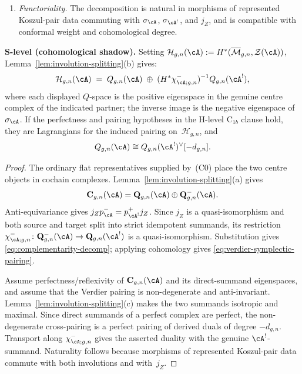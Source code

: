 \begin{theorem}
\begin{enumerate}[label=\textup{(\roman*)}]
\item \emph{Functoriality.}
 The decomposition is natural in morphisms of represented Koszul-pair
 data commuting with \(\sigma_{\cA}\), \(\sigma_{\cA^!}\), and
 \(j_Z\), and is compatible with conformal weight and cohomological
 degree.
\end{enumerate}

\smallskip\noindent
\textbf{S-level \textup{(}cohomological shadow\textup{)}.}
Setting $\mathcal{H}_{g,n}(\cA) := H^*(\overline{\mathcal{M}}_{g,n},
\mathcal{Z}(\cA))$, Lemma~\textup{\ref{lem:involution-splitting}(b)}
gives:
\begin{equation}\label{eq:verdier-symplectic-pairing}
\mathcal{H}_{g,n}(\cA) \;=\;
Q_{g,n}(\cA) \;\oplus\;
(H^*\chi^-_{\cA;g,n})^{-1}Q_{g,n}(\cA^!),
\end{equation}
where each displayed \(Q\)-space is the positive eigenspace in the
genuine centre complex of the indicated partner; the inverse image is
the negative eigenspace of \(\sigma_{\cA}\).
If the perfectness and pairing hypotheses in the H-level
$\mathrm{C}_{1b}$ clause hold, they are Lagrangians for the induced
pairing on~$\mathcal{H}_{g,n}$, and
\begin{equation}\label{eq:quantum-duality}
Q_{g,n}(\cA) \cong Q_{g,n}(\cA^!)^\vee[-d_{g,n}].
\end{equation}
\end{theorem}

\begin{proof}
The ordinary flat representatives supplied by~\textup{(C0)} place the
two centre objects in cochain complexes.  Lemma~\ref{lem:involution-splitting}(a)
gives
\[
 \mathbf C_{g,n}(\cA)
 =\mathbf Q_{g,n}(\cA)\oplus\mathbf Q^-_{g,n}(\cA).
\]
Anti-equivariance gives
\(j_Zp^-_{\cA}=p^+_{\cA^!}j_Z\).  Since \(j_Z\) is a
quasi-isomorphism and both source and target split into strict
idempotent summands, its restriction
\(\chi^-_{\cA;g,n}\colon\mathbf Q^-_{g,n}(\cA)\to
\mathbf Q_{g,n}(\cA^!)\) is a quasi-isomorphism.  Substitution gives
\eqref{eq:complementarity-decomp}; applying cohomology gives
\eqref{eq:verdier-symplectic-pairing}.

Assume perfectness/reflexivity of $\mathbf{C}_{g,n}(\cA)$ and its
direct-summand eigenspaces, and assume that the Verdier pairing is
non-degenerate and anti-invariant.
Lemma~\ref{lem:involution-splitting}(c) makes the two summands
isotropic and maximal. Since direct summands of a perfect complex are
perfect, the non-degenerate cross-pairing is a perfect pairing of
derived duals of degree $-d_{g,n}$.  Transport along
\(\chi^-_{\cA;g,n}\) gives the asserted duality with the genuine
\(\cA^!\)-summand. Naturality follows because morphisms of represented
Koszul-pair data commute with both involutions and with~\(j_Z\).
\end{proof}


